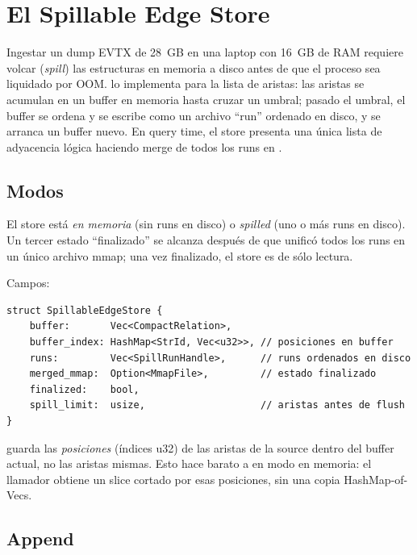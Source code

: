 \chapter{El Spillable Edge Store}
\label{ch:spill}

Ingestar un dump EVTX de 28~GB en una laptop con 16~GB de RAM
requiere volcar (\emph{spill}) las estructuras en memoria a disco
antes de que el proceso sea liquidado por OOM.
 lo implementa para la lista de aristas:
las aristas se acumulan en un buffer en memoria hasta cruzar un
umbral; pasado el umbral, el buffer se ordena y se escribe como un
archivo ``run'' ordenado en disco, y se arranca un buffer nuevo.
En query time, el store presenta una única lista de adyacencia
lógica haciendo merge de todos los runs en .

\section{Modos}

\begin{definition}
El store está \emph{en memoria} (sin runs en disco) o
\emph{spilled} (uno o más runs en disco). Un tercer estado
``finalizado'' se alcanza después de que  unificó
todos los runs en un único archivo mmap; una vez finalizado, el
store es de sólo lectura.
\end{definition}

Campos:

\begin{lstlisting}[style=rust]
struct SpillableEdgeStore {
    buffer:       Vec<CompactRelation>,
    buffer_index: HashMap<StrId, Vec<u32>>, // posiciones en buffer
    runs:         Vec<SpillRunHandle>,      // runs ordenados en disco
    merged_mmap:  Option<MmapFile>,         // estado finalizado
    finalized:    bool,
    spill_limit:  usize,                    // aristas antes de flush
}
\end{lstlisting}

 guarda las \emph{posiciones} (índices u32)
de las aristas de la source  dentro del buffer actual, no
las aristas mismas. Esto hace barato a  en
modo en memoria: el llamador obtiene un slice cortado por esas
posiciones, sin una copia HashMap-of-Vecs.

\section{Append}

